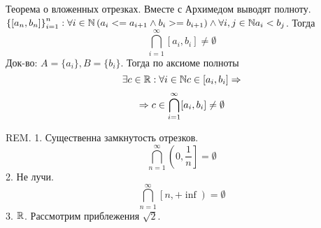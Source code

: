 Теорема о вложенных отрезках. Вместе с Архимедом выводят полноту.
$\left\{\left[a_n, b_n\right]\right\}_{i=1}^n: \forall i \in \mathbb{N} \left(a_i <= a_{i + 1} \land b_i >= b_{i + 1}\right) \land \forall i, j \in \mathbb{N} a_i < b_j$. 
Тогда $$\bigcap_{i=1}^\infty [a_i, b_i] \neq \emptyset$$
Док-во: $A = \{a_i\}, B = \{b_i\}$. Тогда по аксиоме полноты $$\exists c \in \mathbb{R}: \forall i \in \mathbb{N} c \in \left[a_i, b_i\right] \Rightarrow $$
$$\Rightarrow c \in \bigcap_{i=1}^\infty [a_i, b_i] \neq \emptyset$$

REM. 1. Существенна замкнутость отрезков.
$$\bigcap_{n=1}^\infty \left(0, \frac1n\right] = \emptyset$$
2. Не лучи.
$$\bigcap_{n=1}^\infty \left[n, +\inf\right) = \emptyset $$
3. $\mathbb{R}$. Рассмотрим приблежения $\sqrt{2}$.
